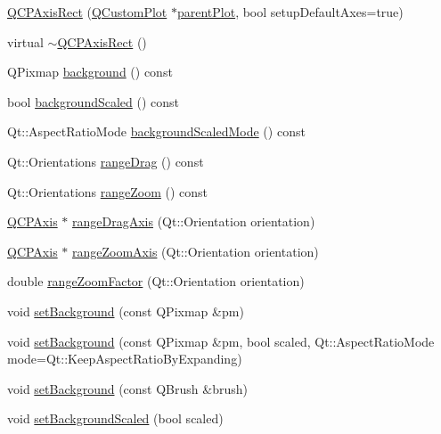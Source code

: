 \begin{DoxyCompactItemize}
\item 
\hyperlink{class_q_c_p_axis_rect_a60b31dece805462c1b82eea2e69ba042}{Q\-C\-P\-Axis\-Rect} (\hyperlink{class_q_custom_plot}{Q\-Custom\-Plot} $\ast$\hyperlink{class_q_c_p_layerable_ab7e0e94461566093d36ffc0f5312b109}{parent\-Plot}, bool setup\-Default\-Axes=true)
\item 
virtual \hyperlink{class_q_c_p_axis_rect_a463c44b1856ddbf82eb3f7b582839cd0}{$\sim$\-Q\-C\-P\-Axis\-Rect} ()
\item 
Q\-Pixmap \hyperlink{class_q_c_p_axis_rect_a0daa1dadd2a62dbfa37b7f742edd0059}{background} () const 
\item 
bool \hyperlink{class_q_c_p_axis_rect_a67c18777b88fe9c81dee3dd2b5f50e5c}{background\-Scaled} () const 
\item 
Qt\-::\-Aspect\-Ratio\-Mode \hyperlink{class_q_c_p_axis_rect_a3d0f42d6be11a0b3d4576402a2b0032d}{background\-Scaled\-Mode} () const 
\item 
Qt\-::\-Orientations \hyperlink{class_q_c_p_axis_rect_af24b46954ce27a26b23770cdb8319080}{range\-Drag} () const 
\item 
Qt\-::\-Orientations \hyperlink{class_q_c_p_axis_rect_a3397fc60e5df29089090bc236e9f05f6}{range\-Zoom} () const 
\item 
\hyperlink{class_q_c_p_axis}{Q\-C\-P\-Axis} $\ast$ \hyperlink{class_q_c_p_axis_rect_a6d7c22cfc54fac7a3d6ef80b133a8574}{range\-Drag\-Axis} (Qt\-::\-Orientation orientation)
\item 
\hyperlink{class_q_c_p_axis}{Q\-C\-P\-Axis} $\ast$ \hyperlink{class_q_c_p_axis_rect_a679c63f2b8daccfe6ec5110dce3dd3b6}{range\-Zoom\-Axis} (Qt\-::\-Orientation orientation)
\item 
double \hyperlink{class_q_c_p_axis_rect_ae4e6c4d143aacc88d2d3c56f117c2fe1}{range\-Zoom\-Factor} (Qt\-::\-Orientation orientation)
\item 
void \hyperlink{class_q_c_p_axis_rect_af615ab5e52b8e0a9a0eff415b6559db5}{set\-Background} (const Q\-Pixmap \&pm)
\item 
void \hyperlink{class_q_c_p_axis_rect_ac48a2d5d9b7732e73b86605c69c5e4c1}{set\-Background} (const Q\-Pixmap \&pm, bool scaled, Qt\-::\-Aspect\-Ratio\-Mode mode=Qt\-::\-Keep\-Aspect\-Ratio\-By\-Expanding)
\item 
void \hyperlink{class_q_c_p_axis_rect_a22a22b8668735438dc06f9a55fe46b33}{set\-Background} (const Q\-Brush \&brush)
\item 
void \hyperlink{class_q_c_p_axis_rect_ae6d36c3e0e968ffb991170a018e7b503}{set\-Background\-Scaled} (bool scaled)

\end{DoxyCompactItemize}
